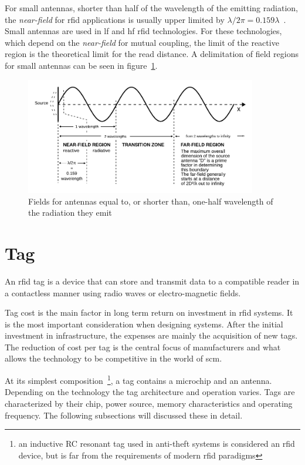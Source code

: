 For small antennas, shorter than half of the wavelength of the emitting radiation, the \emph{near-field} for \ac{rfid} applications is usually upper limited by $\lambda / 2\pi = 0.159\lambda$~\cite{nikitinOverviewFieldUHF2007a}.
Small antennas are used in \ac{lf} and \ac{hf} \ac{rfid} technologies.
For these technologies, which depend on the \emph{near-field} for mutual coupling, the limit of the reactive region is the theoretical limit for the read distance.
A delimitation of field regions for small antennas can be seen in figure~\ref{fig:fieldregionsshortantenna}.

\begin{figure}[!ht]
    \centering
    \includegraphics[width=0.9\textwidth]{./figs/02-state-of-the-art/Field_regions_for_typical_antennas_vector.pdf}
    \caption{Fields for antennas equal to, or shorter than, one-half wavelength of the radiation they emit~\cite{SafetyHealthTopics}} 
    \label{fig:fieldregionsshortantenna}
\end{figure}

\section{Tag} \label{sec:tag}

An \ac{rfid} tag is a device that can store and transmit data to a compatible reader in a contactless manner using radio waves or electro-magnetic fields.

Tag cost is the main factor in long term return on investment in \ac{rfid} systems. It is the most important consideration when designing systems. After the initial investment in infrastructure, the expenses are mainly the acquisition of new tags.
The reduction of cost per tag is the central focus of manufacturers and what allows the technology to be competitive in the world of \ac{scm}.

At its simplest composition~\footnote{an inductive RC resonant tag used in anti-theft systems is considered an \ac{rfid} device, but is far from the requirements of modern \ac{rfid} paradigms}, a tag contains a microchip and an antenna.
Depending on the technology the tag architecture and operation varies.
Tags are characterized by their chip, power source, memory characteristics and operating frequency. The following subsections will discussed these in detail.


